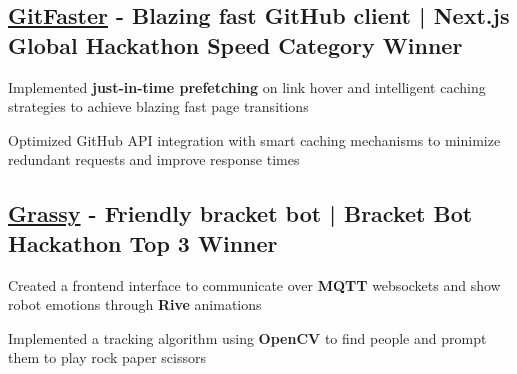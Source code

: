 

\subsection{\href{https://gitfaster.dev/}{GitFaster} - Blazing fast GitHub client | \textbf{Next.js Global Hackathon Speed Category Winner}}
\begin{zitemize}
    \item Implemented \textbf{just-in-time prefetching} on link hover and intelligent caching strategies to achieve blazing fast page transitions
    \item Optimized GitHub API integration with smart caching mechanisms to minimize redundant requests and improve response times
\end{zitemize}

\vspace{0.3cm}\subsection{\href{https://github.com/arian81/bracket-bot-controller}{Grassy} - Friendly bracket bot | \textbf{Bracket Bot Hackathon Top 3 Winner}}
\begin{zitemize}
    \item Created a frontend interface to communicate over \textbf{MQTT} websockets and show robot emotions through \textbf{Rive} animations
    \item Implemented a tracking algorithm using \textbf{OpenCV} to find people and prompt them to play rock paper scissors
\end{zitemize}


